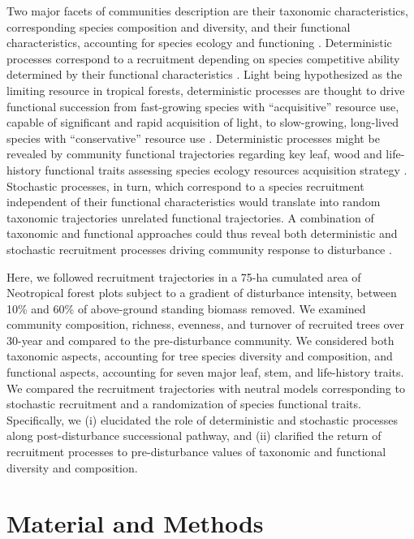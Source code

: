 \documentclass[fleqn,10pt]{ArtEcoFoG} %
\begin{document}
Two major facets of communities description are their taxonomic characteristics, corresponding species composition and diversity, and their functional characteristics, accounting for species ecology and functioning \citep{Macarthur1967, Violle2007b, Kunstler2016}.
Deterministic processes correspond to a recruitment depending on species competitive ability determined by their functional characteristics \citep{Rees2001, Perronne2017}.
Light being hypothesized as the limiting resource in tropical forests, deterministic processes are thought to drive functional succession from fast-growing species with ``acquisitive'' resource use, capable of significant and rapid acquisition of light, to slow-growing, long-lived species with ``conservative'' resource use \citep{Denslow1980, Molino2001, Bongers2009}.
Deterministic processes might be revealed by community functional trajectories regarding key leaf, wood and life-history functional traits assessing species ecology resources acquisition strategy \citep{Wright2004, Chave2009b, Herault2011}.
Stochastic processes, in turn, which correspond to a species recruitment independent of their functional characteristics would translate into random taxonomic trajectories unrelated functional trajectories.
A combination of taxonomic and functional approaches could thus reveal both deterministic and stochastic recruitment processes driving community response to disturbance \citep{Fukami2005, Chalmandrier2015, Cequinel2018}.

Here, we followed recruitment trajectories in a 75-ha cumulated area of Neotropical forest plots subject to a gradient of disturbance intensity, between 10\% and 60\% of above-ground standing biomass removed. We examined community composition, richness, evenness, and turnover of recruited trees over 30-year and compared to the pre-disturbance community. We considered both taxonomic aspects, accounting for tree species diversity and composition, and functional aspects, accounting for seven major leaf, stem, and life-history traits. We compared the recruitment trajectories with neutral models corresponding to stochastic recruitment and a randomization of species functional traits. Specifically, we (i) elucidated the role of deterministic and stochastic processes along post-disturbance successional pathway, and (ii) clarified the return of recruitment processes to pre-disturbance values of taxonomic and functional diversity and composition.

\hypertarget{material-and-methods}{%
\section{Material and Methods}\label{material-and-methods}}
\end{document}
